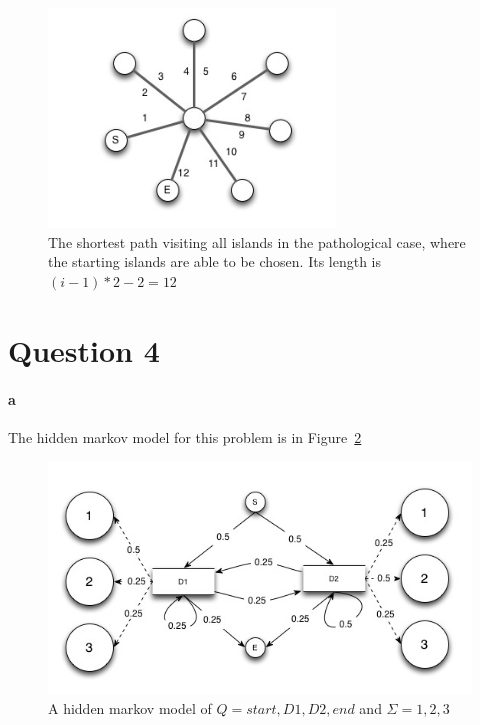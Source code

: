 \documentclass[12pt]{article}
\begin{document}
\begin{figure}[htb]
	\begin{center}
		\includegraphics[width=3in]{onegraph.jpg}
	\end{center}
	\caption{The shortest path visiting all islands in the pathological case, where the starting islands are able to be chosen.  Its length is $(i-1)*2 - 2 = 12$}
	\label{onegraph}
\end{figure}

\clearpage

\section*{Question 4}
\paragraph{a}  The hidden markov model for this problem is in Figure~\ref{hmm}

\begin{figure}[htb]
	\begin{center}
		\includegraphics[width=4.5in]{hmm.jpg}
	\end{center}
	\caption{A hidden markov model of $Q=\textit{start},D1,D2,\textit{end}$ and $\Sigma = 1,2,3$}
	\label{hmm}
\end{figure}
\end{document}
